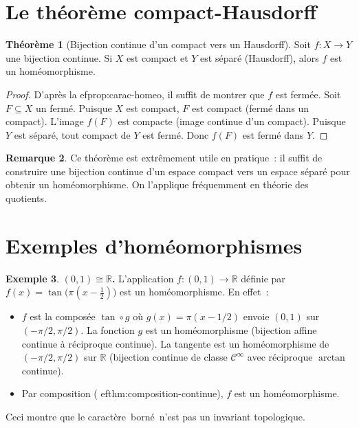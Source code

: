 \documentclass[12pt,a4paper,openany]{book}
\theoremstyle{definition}
\theoremstyle{cours}
\newtheorem{theoreme}{Théorème}[chapter]
\theoremstyle{coursnormal}
\newtheorem{remarque}[theoreme]{Remarque}
\newtheorem{exemple}[theoreme]{Exemple}
\newcommand{\R}{\mathbb{R}}
\providecommand{\og}{\guillemotleft\,}
\providecommand{\fg}{\,\guillemotright}
\begin{document}
\section{Le théorème compact-Hausdorff}\label{sec:compact-hausdorff}

\begin{theoreme}[Bijection continue d'un compact vers un Hausdorff]\label{thm:compact-hausdorff}
  Soit $f\colon X\to Y$ une bijection continue. Si $X$ est
  compact et $Y$ est séparé (Hausdorff), alors $f$ est un homéomorphisme.
\end{theoreme}

\begin{proof}
  D'après la 
ef{prop:carac-homeo}, il suffit de montrer que $f$ est
  fermée. Soit $F\subseteq X$ un fermé. Puisque $X$ est compact, $F$ est
  compact (fermé dans un compact). L'image $f(F)$ est compacte (image
  continue d'un compact). Puisque $Y$ est séparé, tout compact de $Y$ est
  fermé. Donc $f(F)$ est fermé dans $Y$.
\end{proof}

\begin{remarque}
  Ce théorème est extrêmement utile en pratique~: il suffit de construire une
  bijection continue d'un espace compact vers un espace séparé pour obtenir
  un homéomorphisme. On l'applique fréquemment en théorie des quotients.
\end{remarque}

\section{Exemples d'homéomorphismes}\label{sec:exemples-homeo}

\begin{exemple}\label{ex:homeo-01-R}
  \textbf{$(0,1)\cong\R$.}
  L'application $f\colon(0,1)\to\R$ définie par
  $f(x)=\tan\bigl(\pi(x-\tfrac{1}{2})\bigr)$ est un homéomorphisme. En
  effet~:
  \begin{itemize}
    \item $f$ est la composée $\tan\circ g$ où $g(x)=\pi(x-1/2)$ envoie
      $(0,1)$ sur $(-\pi/2,\pi/2)$. La fonction $g$ est un homéomorphisme
      (bijection affine continue à réciproque continue). La tangente est un
      homéomorphisme de $(-\pi/2,\pi/2)$ sur $\R$ (bijection continue de
      classe $\mathcal{C}^\infty$ avec réciproque $\arctan$ continue).
    \item Par composition (
ef{thm:composition-continue}), $f$ est un
      homéomorphisme.
  \end{itemize}
  Ceci montre que le caractère \og{}borné\fg{} n'est pas un invariant
  topologique.
\end{exemple}
\end{document}
